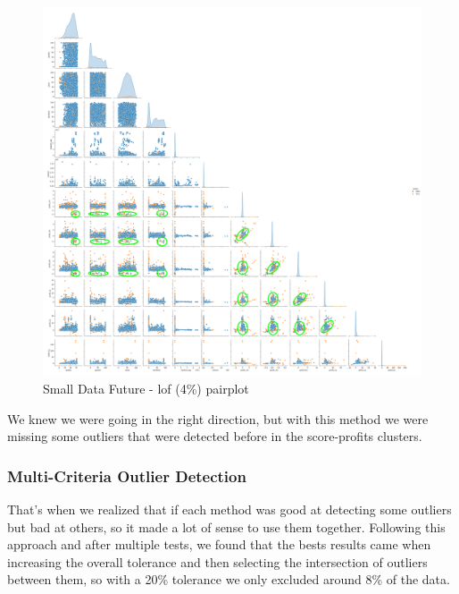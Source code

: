 \documentclass[11pt,english,a4paper,hidelinks]{book}
\begin{document}
\begin{figure}[H]
    \centering
    \includegraphics[width=1\textwidth]{images/code/outliers/Small Data future - LOF.png}
    \caption{Small Data Future - \acrshort{lof} (4\%) \acrshort{pairplot}}
    \label{fig:small_data_future_lof}
\end{figure}

\noindent We knew we were going in the right direction, but with this method we were missing some outliers that were detected before in the score-profits clusters.

\newpage
\subsubsection{Multi-Criteria Outlier Detection}

That's when we realized that if each method was good at detecting some outliers but bad at others, so it made a lot of sense to use them together. Following this approach and after multiple tests, we found that the bests results came when increasing the overall tolerance and then selecting the intersection of outliers between them, so with a 20\% tolerance we only excluded around 8\% of the data.
\end{document}
